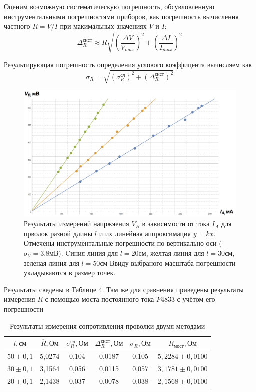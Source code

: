 \documentclass[a4paper,12pt]{article} %
\begin{document}
Оценим возможную систематическую погрешность, обсувловленную инструментальными погрешностями приборов, как погрешность вычисления частного $R=V/I$ при макимальных значениях $V$ и $I$:
\[\Delta_R^\text{сист} \approx R\sqrt{\left(\frac{\Delta V}{V_{max}}\right)^2+\left(\frac{\Delta I}{I_{max}}\right)^2}\]

Результирующая погрешность определения углового коэффицента вычисляем как
\[\sigma_R = \sqrt{(\sigma_R^\text{сл})^2+(\Delta_R^\text{сист})^2}\]
\begin{figure}[h]
\centering
\includegraphics[width=1\textwidth]{itog}
\caption{Результаты измерений напржяения $V_B$ в зависимости от тока $I_A$ для прволок разной длины $l$ и их линейная аппроксимация $y=kx$. Отмечены инструментальные погрешности по вертикально оси ($\sigma_V=3.8\text{мВ}$). Cиния линия для $l=20\text{см}$, желтая линия для $l=30\text{см}$, зеленая линия для $l=50\text{см}$ Ввиду выбраного масштаба погрешности укладываются в размер точек.  } \label{dz1}
\end{figure}

Результаты сведены в Таблице 4. Там же для сравнения приведены результаты измерения $R$ с помощью моста постоянного тока $P4833$ с учётом его погрешности
\begin{table}[h]
\caption{Результаты измерения сопротивления проволки двумя методами}
\centering
\label{dich}
\begin{tabular}{|c|c|c|c|c|c|}
\hline
\rule{0cm}{4mm}
$l,\text{см}$ & $\overline{R}, \text{Ом}$ & $\sigma_R^\textbf{сл}, \text{Ом}$ & $\Delta_R^\text{сист}, \text{Ом}$ & $\sigma_R, \text{Ом}$ & $R_{\text{мост}}, \text{Ом}$\\ \hline
$50\pm0,1$ & 5,0274 & 0,104 & 0,0187& 0,105& $5,2284\pm0,0100$ \\ \hline
$30\pm0,1$ & 3,1564 & 0,056 & 0,0115& 0,057& $3,1781\pm 0,0100$\\ \hline
$20\pm0,1$ & 2,1438 & 0,037 & 0,0078& 0,038& $2,1568\pm0,0100$ \\ \hline
\end{tabular}
\end{table}
\newpage
\end{document}
